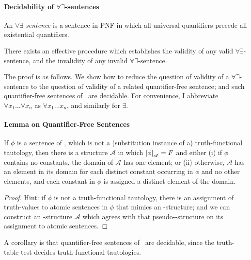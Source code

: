 \paragraph{Decidability of $\forall\exists$-sentences}

An \emph{$\forall\exists$-sentence} is a sentence in PNF in which all universal quantifiers precede all existential quantifiers.

\begin{theorem}
	There exists an effective procedure which establishes the validity of any valid $\forall\exists$-sentence, and the invalidity of any invalid $\forall\exists$-sentence.
\end{theorem} 

The proof is as follows. We show how to reduce the question of validity of a $\forall\exists$-sentence to the question of validity of a related quantifier-free sentence; and such quantifier-free sentences of \ltwo\ are decidable. For convenience, I abbreviate $\forall x_{1} \ldots \forall x_{n}$ as $\forall x_{1}\ldots x_{n}$, and similarly for $\exists$.

\paragraph{Lemma on Quantifier-Free Sentences}

\begin{lemma} \label{qfs}
	If $\phi$ is a sentence of \ltwo, which is not a (substitution instance of a) truth-functional tautology, then there is a structure $\mathscr{A}$ in which $\left|\phi\right|_{\mathscr{A}}=F$ and either (i) if $\phi$ contains no constants, the domain of $\mathscr{A}$ has one element; or (ii) otherwise, $\mathscr{A}$ has an element in its domain for each distinct constant occurring in $\phi$ and no other elements, and each constant in $\phi$ is assigned a distinct element of the domain.  \begin{proof}
		{Hint: if $\phi$ is not a truth-functional tautology, there is an assignment of truth-values to atomic sentences in $\phi$ that mimics an \lone-structure; and  we can construct an \ltwo-structure $\mathscr{A}$ which agrees with that pseudo-\lone-structure on its assignment to atomic sentences.}
	\end{proof}
\end{lemma}
A corollary is that quantifier-free sentences of \ltwo\ are decidable, since the truth-table test decides truth-functional tautologies. 

